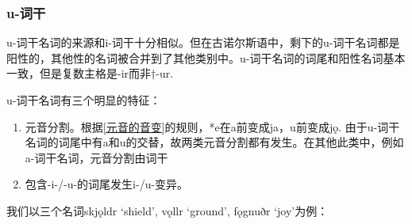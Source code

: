 \subsubsection{u-词干}\label{u-词干}

u-词干名词的来源和i-词干十分相似。但在古诺尔斯语中，剩下的u-词干名词都是阳性的，其他性的名词被合并到了其他类别中。u-词干名词的词尾和阳性名词基本一致，但是复数主格是-ir而非†-ur.

u-词干名词有三个明显的特征：

\begin{enumerate}
  \def\labelenumi{\arabic{enumi})}
  \item
        元音分割。根据\ref{元音的音变}的规则，*e在a前变成ja，u前变成jǫ.
        由于u-词干名词的词尾中有a和u的交替，故两类元音分割都有发生。在其他此类中，例如a-词干名词，元音分割由词干
  \item
        包含-i-/-u-的词尾发生i-/u-变异。
\end{enumerate}

我们以三个名词skjǫldr `shield', vǫllr `ground', fǫgnuðr `joy'为例：


